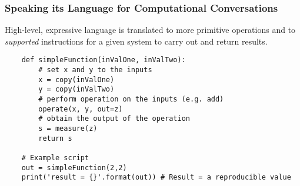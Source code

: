
\begin{frame}[fragile]
  \frametitle{Speaking its Language for Computational Conversations}
  High-level, expressive language is translated to more primitive
  operations and to \emph{supported} instructions for a given system to
  carry out and return results.
  
  \begin{lstlisting}
    def simpleFunction(inValOne, inValTwo):
        # set x and y to the inputs
        x = copy(inValOne) 
        y = copy(inValTwo)
        # perform operation on the inputs (e.g. add)
        operate(x, y, out=z)
        # obtain the output of the operation
        s = measure(z)
        return s

    # Example script
    out = simpleFunction(2,2)
    print('result = {}'.format(out)) # Result = a reproducible value
  \end{lstlisting}
  
\end{frame}
